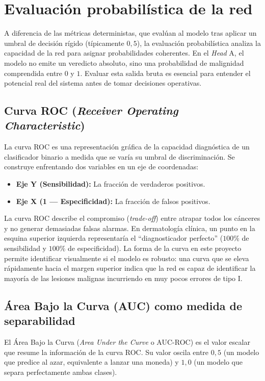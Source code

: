\section{Evaluación probabilística de la red}

A diferencia de las métricas deterministas, que evalúan al modelo tras aplicar un umbral de decisión rígido (típicamente $0,5$), la evaluación probabilística analiza la capacidad de la red para asignar probabilidades coherentes. En el \textit{Head} A, el modelo no emite un veredicto absoluto, sino una probabilidad de malignidad comprendida entre $0$ y $1$. Evaluar esta salida bruta es esencial para entender el potencial real del sistema antes de tomar decisiones operativas.

\subsection{Curva ROC (\textit{Receiver Operating Characteristic})}

La curva ROC es una representación gráfica de la capacidad diagnóstica de un clasificador binario a medida que se varía su umbral de discriminación. Se construye enfrentando dos variables en un eje de coordenadas:

\begin{itemize}
	\item \textbf{Eje Y (Sensibilidad):} La fracción de verdaderos positivos.
	\item \textbf{Eje X (1 --- Especificidad):} La fracción de falsos positivos.
\end{itemize}

La curva ROC describe el compromiso (\textit{trade-off}) entre atrapar todos los cánceres y no generar demasiadas falsas alarmas. En dermatología clínica, un punto en la esquina superior izquierda representaría el ``diagnosticador perfecto'' ($100\%$ de sensibilidad y $100\%$ de especificidad). La forma de la curva en este proyecto permite identificar visualmente si el modelo es robusto: una curva que se eleva rápidamente hacia el margen superior indica que la red es capaz de identificar la mayoría de las lesiones malignas incurriendo en muy pocos errores de tipo I.

\subsection{Área Bajo la Curva (AUC) como medida de separabilidad}

El Área Bajo la Curva (\textit{Area Under the Curve} o AUC-ROC) es el valor escalar que resume la información de la curva ROC. Su valor oscila entre $0,5$ (un modelo que predice al azar, equivalente a lanzar una moneda) y $1,0$ (un modelo que separa perfectamente ambas clases).

